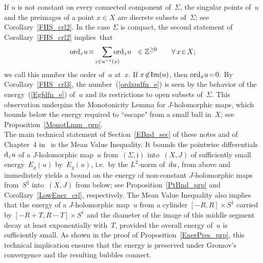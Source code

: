 \documentclass[11pt]{article}
\numberwithin{equation}{section}
\theoremstyle{definition}
\def\BE#1{\begin{equation}\label{#1}}
\def\EE{\end{equation}}
\def\eref#1{(\ref{#1})}
\def\sf#1{\textsf{#1}}
\def\fj{\mathfrak j}
\def\Z{{\mathbb Z}}
\def\Si{\Sigma}
\def\Im{\textnormal{Im}}
\def\nd{\textnormal{d}}
\def\ord{\textnormal{ord}}
\begin{document}
\noindent
If $u$ is not constant on every connected component of~$\Si$,
the singular points of~$u$ and the preimages of a point $x\!\in\!X$ 
are discrete subsets of~$\Si$; see Corollary~\ref{FHS_crl2}. 
In the case $\Si$ is compact, the second statement of Corollary~\ref{FHS_crl2} implies~that 
\BE{ordxudfn_e}\ord_xu\!\equiv\!\sum_{z\in u^{-1}(x)}\!\!\!\!\!\!\ord_zu
~~\in\Z^{\ge0}
\qquad\forall\,x\!\in\!X;\EE
we call this number the \sf{order of~$u$ at~$x$}.
If $x\!\not\in\!\Im(u)$, then $\ord_xu\!=\!0$.
By Corollary~\ref{FHS_crl3}, the number~\eref{ordxudfn_e} is seen by the behavior of 
the energy~\eref{Egfdfn_e} of~$u$ and its restrictions to open subsets of~$\Si$.
This observation underpins the \sf{Monotonicity Lemma} for $J$-holomorphic maps,
which bounds below the energy required to ``escape" from a small ball in~$X$;
see Proposition~\ref{MonotLmm_prp}.\\

\noindent
The main technical statement of Section~\ref{EBnd_sec} of these notes and 
of Chapter~4 in~\cite{MS12} is the \sf{Mean Value Inequality}.
It bounds the pointwise differentials $\nd_zu$ of a $J$-holomorphic map~$u$ 
from~$(\Si,\fj)$ into~$(X,J)$ of sufficiently small energy~$E_g(u)$ by~$E_g(u)$,
i.e.~by the $L^2$-norm of~$\nd u$, from above and immediately yields a bound
on the energy of non-constant $J$-holomorphic maps from~$S^2$ into~$(X,J)$ from below; 
see Proposition~\ref{PtBnd_prp} and Corollary~\ref{LowEner_crl}, respectively.
The Mean Value Inequality also implies that the energy of a $J$-holomorphic map~$u$ 
from a cylinder $[-R,R]\!\times\!S^1$ carried by \hbox{$[-R\!+\!T,R\!-\!T]\!\times\!S^1$}
and the diameter of the image of this middle segment decay at least exponentially 
with~$T$, provided the overall energy of~$u$ is sufficiently small.
As shown in the proof of Proposition~\ref{EnerPres_prp}, 
this technical implication ensures that \sf{the energy is preserved} under Gromov's convergence
and the resulting \sf{bubbles connect}.\\
\end{document}
